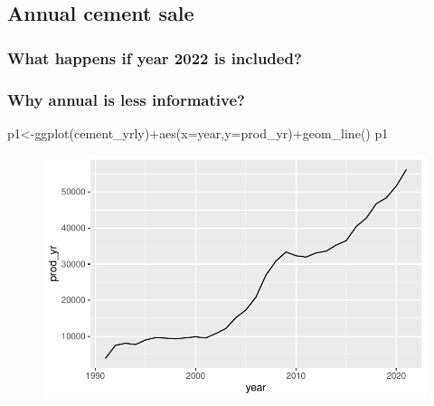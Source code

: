 \documentclass[
  letterpaper,
  DIV=11,
  numbers=noendperiod]{scrartcl}
\newenvironment{Shaded}{\begin{snugshade}}{\end{snugshade}}
\newcommand{\AttributeTok}[1]{\textcolor[rgb]{0.40,0.45,0.13}{#1}}
\newcommand{\FunctionTok}[1]{\textcolor[rgb]{0.28,0.35,0.67}{#1}}
\newcommand{\NormalTok}[1]{\textcolor[rgb]{0.00,0.23,0.31}{#1}}
\newcommand{\OtherTok}[1]{\textcolor[rgb]{0.00,0.23,0.31}{#1}}
\newcommand{\SpecialCharTok}[1]{\textcolor[rgb]{0.37,0.37,0.37}{#1}}
\begin{document}
\hypertarget{annual-cement-sale}{%
\subsection{Annual cement sale}\label{annual-cement-sale}}

\hypertarget{what-happens-if-year-2022-is-included}{%
\subsubsection{What happens if year 2022 is
included?}\label{what-happens-if-year-2022-is-included}}

\hypertarget{why-annual-is-less-informative}{%
\subsubsection{Why annual is less
informative?}\label{why-annual-is-less-informative}}

\begin{Shaded}
\begin{Highlighting}[]
\NormalTok{p1}\OtherTok{\textless{}{-}}\FunctionTok{ggplot}\NormalTok{(cement\_yrly)}\SpecialCharTok{+}\FunctionTok{aes}\NormalTok{(}\AttributeTok{x=}\NormalTok{year,}\AttributeTok{y=}\NormalTok{prod\_yr)}\SpecialCharTok{+}\FunctionTok{geom\_line}\NormalTok{()}
\NormalTok{p1}
\end{Highlighting}
\end{Shaded}

\begin{figure}[H]

{\centering \includegraphics[width=17.1875in,height=\textheight]{cement_files/figure-pdf/unnamed-chunk-5-1.pdf}

}

\end{figure}
\end{document}
